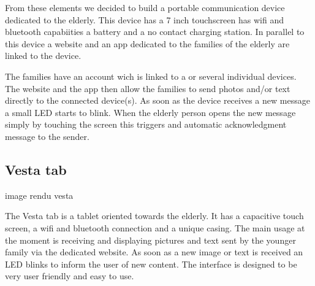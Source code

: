 From these elements we decided to build a portable communication device dedicated to the elderly. This device has a 7 inch touchscreen has wifi and bluetooth
capabiities a battery and a no contact charging station. In parallel to this device a website and an app dedicated to the families of the elderly are linked to the device.

The families have an account wich is linked to a or several individual devices. The website and the app then allow the families to send photos and/or text directly to the connected device(s).
As soon as the device receives a new message a small LED starts to blink. When the elderly person opens the new message simply by touching the screen this triggers and automatic acknowledgment message to the sender.

\subsection{Vesta tab}
          image rendu vesta

The Vesta tab is a tablet oriented towards the elderly. It has a capacitive touch screen, a wifi and bluetooth connection and a unique casing. The main usage at the moment is receiving and displaying pictures and text sent by the younger family via the dedicated website. As soon as a new image or text is received an LED blinks to inform the user of new content. The interface is designed to be very user friendly and easy to use.
